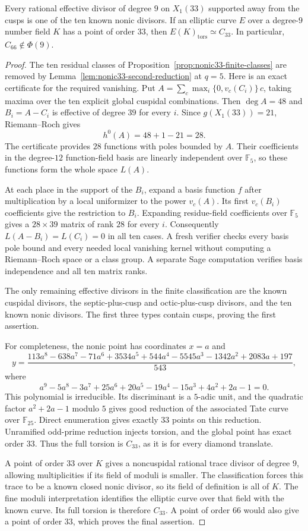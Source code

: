 \begin{theorem}\label{thm:nonic33-complete}
Every rational effective divisor of degree $9$ on $X_1(33)$ supported
away from the cusps is one of the ten known nonic divisors.
If an elliptic curve $E$ over a degree-$9$ number field $K$ has a point
of order $33$, then $E(K)_{\mathrm{tors}}\simeq C_{33}$.
In particular, $C_{66}\notin\Phi(9)$.
\end{theorem}
\begin{proof}
The ten residual classes of Proposition~\ref{prop:nonic33-finite-classes}
are removed by Lemma~\ref{lem:nonic33-second-reduction} at $q=5$.
Here is an exact certificate for the required vanishing.
Put $A=\sum_c\max_i\{0,v_c(C_i)\}\,c$, taking maxima over the ten
explicit global cuspidal combinations. Then $\deg A=48$ and
$B_i=A-C_i$ is effective of degree $39$ for every $i$.
Since $g(X_1(33))=21$, Riemann--Roch gives
\[
 h^0(A)=48+1-21=28.
\]
The certificate provides $28$ functions with poles bounded by $A$.
Their coefficients in the degree-$12$ function-field basis are
linearly independent over $\mathbb F_5$, so these functions form the
whole space $L(A)$.

At each place in the support of the $B_i$, expand a basis function
$f$ after multiplication by a local uniformizer to the power $v_c(A)$.
Its first $v_c(B_i)$ coefficients give the restriction to $B_i$.
Expanding residue-field coefficients over $\mathbb F_5$ gives a
$28\times39$ matrix of rank $28$ for every $i$.
Consequently $L(A-B_i)=L(C_i)=0$ in all ten cases.
A fresh verifier checks every basis pole bound and every needed
local vanishing kernel without computing a Riemann--Roch space or
a class group. A separate Sage computation verifies basis
independence and all ten matrix ranks.

The only remaining effective divisors in the finite classification
are the known cuspidal divisors, the septic-plus-cusp and
octic-plus-cusp divisors, and the ten known nonic divisors.
The first three types contain cusps, proving the first assertion.

For completeness, the nonic point has coordinates $x=a$ and
\[
 y=\frac{113a^8-638a^7-71a^6+3534a^5+544a^4
 -5545a^3-1342a^2+2083a+197}{543},
\]
where
\[
 a^9-5a^8-3a^7+25a^6+20a^5-19a^4-15a^3+4a^2+2a-1=0.
\]
This polynomial is irreducible. Its discriminant is a $5$-adic unit,
and the quadratic factor $a^2+2a-1$ modulo $5$ gives good reduction
of the associated Tate curve over $\mathbb F_{25}$.
Direct enumeration gives exactly $33$ points on this reduction.
Unramified odd-prime reduction injects torsion, and the global point
has exact order $33$. Thus the full torsion is $C_{33}$, as it is for
every diamond translate.

A point of order $33$ over $K$ gives a noncuspidal rational trace
divisor of degree $9$, allowing multiplicities if its field of
moduli is smaller. The classification forces this trace to be a
known closed nonic divisor, so its field of definition is all of $K$.
The fine moduli interpretation identifies the elliptic curve over
that field with the known curve. Its full torsion is therefore
$C_{33}$. A point of order $66$ would also give a point of order $33$,
which proves the final assertion.
\end{proof}
